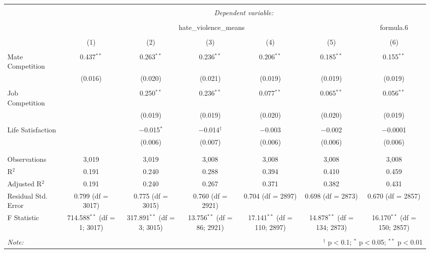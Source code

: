 
\begin{table}[!htbp] \centering 
  \caption{} 
  \label{} 
\begin{tabular}{@{\extracolsep{5pt}}lcccccc} 
\\[-1.8ex]\hline 
\hline \\[-1.8ex] 
 & \multicolumn{6}{c}{\textit{Dependent variable:}} \\ 
\cline{2-7} 
\\[-1.8ex] & \multicolumn{5}{c}{hate\_violence\_means} & formula.6 \\ 
\\[-1.8ex] & (1) & (2) & (3) & (4) & (5) & (6)\\ 
\hline \\[-1.8ex] 
 Mate Competition & 0.437$^{**}$ & 0.263$^{**}$ & 0.236$^{**}$ & 0.206$^{**}$ & 0.185$^{**}$ & 0.155$^{**}$ \\ 
  & (0.016) & (0.020) & (0.021) & (0.019) & (0.019) & (0.019) \\ 
  & & & & & & \\ 
 Job Competition &  & 0.250$^{**}$ & 0.236$^{**}$ & 0.077$^{**}$ & 0.065$^{**}$ & 0.056$^{**}$ \\ 
  &  & (0.019) & (0.019) & (0.020) & (0.020) & (0.019) \\ 
  & & & & & & \\ 
 Life Satisfaction &  & $-$0.015$^{*}$ & $-$0.014$^{\dagger}$ & $-$0.003 & $-$0.002 & $-$0.0001 \\ 
  &  & (0.006) & (0.007) & (0.006) & (0.006) & (0.006) \\ 
  & & & & & & \\ 
\hline \\[-1.8ex] 
Observations & 3,019 & 3,019 & 3,008 & 3,008 & 3,008 & 3,008 \\ 
R$^{2}$ & 0.191 & 0.240 & 0.288 & 0.394 & 0.410 & 0.459 \\ 
Adjusted R$^{2}$ & 0.191 & 0.240 & 0.267 & 0.371 & 0.382 & 0.431 \\ 
Residual Std. Error & 0.799 (df = 3017) & 0.775 (df = 3015) & 0.760 (df = 2921) & 0.704 (df = 2897) & 0.698 (df = 2873) & 0.670 (df = 2857) \\ 
F Statistic & 714.588$^{**}$ (df = 1; 3017) & 317.891$^{**}$ (df = 3; 3015) & 13.756$^{**}$ (df = 86; 2921) & 17.141$^{**}$ (df = 110; 2897) & 14.878$^{**}$ (df = 134; 2873) & 16.170$^{**}$ (df = 150; 2857) \\ 
\hline 
\hline \\[-1.8ex] 
\textit{Note:}  & \multicolumn{6}{r}{$^{\dagger}$ p$<$0.1; $^{*}$ p$<$0.05; $^{**}$ p$<$0.01} \\ 
\end{tabular} 
\end{table} 
